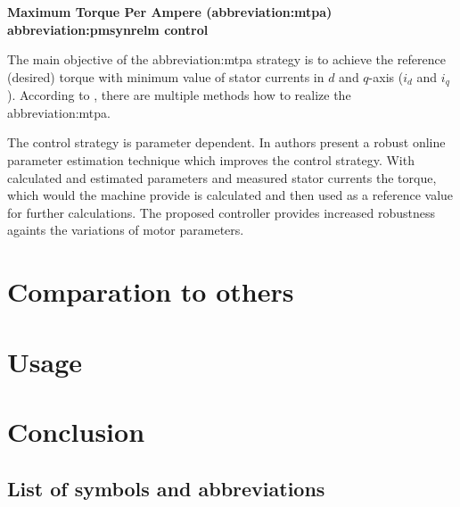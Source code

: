 \documentclass[a4paper, twoside, 11pt]{article}
\newcommand{\fbar}{\FloatBarrier} %
\begin{document}
            \vspace*{1.5cm}
             \hspace*{-\parindent} \textbf{Maximum Torque Per Ampere (\gls{abbreviation:mtpa}) \gls{abbreviation:pmsynrelm} control}\par
                \parskip The main objective of the \gls{abbreviation:mtpa} strategy is to achieve the reference (desired) torque with minimum value of stator currents in $d$ and $q$-axis ($i_d$ and $i_q$). According to \cite{dwivedi-review-on-control-strategies-of-permanent-magnet-assisted-synchronous-reluctance-motor-drive}, there are multiple methods how to realize the \gls{abbreviation:mtpa}.\par
                The control strategy is parameter dependent. In \cite{niazi-robust-maximum-torque-per-ampere-control-of-pmsynrelm} authors present a robust online parameter estimation technique which improves the control strategy. With calculated and estimated parameters and measured stator currents the torque, which would the machine provide is calculated and then used as a reference value for further calculations. The proposed controller provides increased robustness againts the variations of motor parameters.

\section{Comparation to others}

\section{Usage}

\newpage
{} 
\section*{Conclusion}

\flushbottom %


\newpage
\setmonofont{Times New Roman}

\printbibliography[title={{References}}]	
\nocite{*}
\setmonofont{CourierPrime-Regular}

\appendix
{}

\begin{appendices}
	\section{List of symbols and abbreviations}

		\printglossary[type=abbreviationslist, style = myStyleAbbreviations]

		\fbar
		\printglossary[type=symbolslist, style =  myStyleSymbols]

	\end{appendices}
\end{document}
